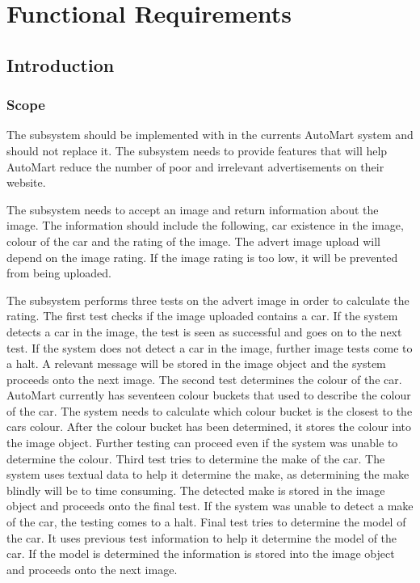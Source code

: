 \section{Functional Requirements}
\subsection{Introduction}

\subsubsection{Scope}
The subsystem should be implemented with in the currents AutoMart system and should not replace it. The subsystem needs to provide features that will help AutoMart reduce the number of poor and irrelevant advertisements on their website.

The subsystem needs to accept an image and return information about the image. The information should include the following, car existence in the image, colour of the car and the rating of the image. The advert image upload will depend on the image rating. If the image rating is too low, it will be prevented from being uploaded. 

The subsystem performs three tests on the advert image in order to calculate the rating. The first test checks if the image uploaded contains a car. If the system detects a car in the image, the test is seen as successful and goes on to the next test. If the system does not detect a car in the image, further image tests come to a halt. A relevant message will be stored in the image object and the system proceeds onto the next image. The second test determines the colour of the car. AutoMart currently has seventeen colour buckets that used to describe the colour of the car. The system needs to calculate which colour bucket is the closest to the cars colour. After the colour bucket has been determined, it stores the colour  into the image object. Further testing can proceed even if the system was unable to determine the colour. Third test tries to determine the make of the car. The system uses textual data to help it determine the make, as determining the make blindly will be to time consuming. The detected make is stored in the image object and proceeds onto the final test. If the system was unable to detect a make of the car, the testing comes to a halt. Final test tries to determine the model of the car. It uses previous test information to help it determine the model of the car. If the model is determined the information is stored into the image object and proceeds onto the next image.

